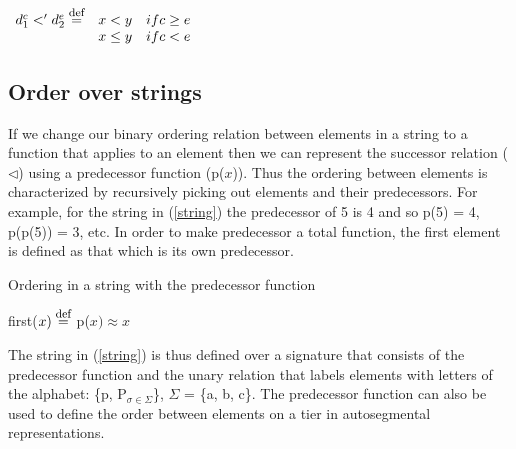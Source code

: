 \documentclass[,doc,floatsintext]{apa6}
\def\defeq{\mathrel{\buildrel \mbox{\footnotesize def} \over =}}
\theoremstyle{definition}
\theoremstyle{definition}
\theoremstyle{definition}
\theoremstyle{remark}
\begin{document}
\hspace{1.85in}
\(\begin{array}{ccc} d^c_1 <' d^e_2 \defeq & x<y & if c\geq e \\  & x\leq y & if c<e \end{array}\)
\vspace{0.2in}

\subsection{Order over strings}\label{order-over-strings}

If we change our binary ordering relation between elements in a string
to a function that applies to an element then we can represent the
successor relation (\(\lhd\)) using a predecessor function (p(\(x\))).
Thus the ordering between elements is characterized by recursively
picking out elements and their predecessors. For example, for the string
in (\ref{string}) the predecessor of 5 is 4 and so p(5) = 4, p(p(5)) =
3, etc. In order to make predecessor a total function, the first element
is defined as that which is its own predecessor.

\begin{exe}
\ex Ordering in a string with the predecessor function \label{string}\\
  
\ex first($x) \defeq$ p($x) \approx x$
\end{exe}

\noindent The string in (\ref{string}) is thus defined over a signature
that consists of the predecessor function and the unary relation that
labels elements with letters of the alphabet: \{p,
P\(_{\sigma\in\Sigma}\)\}, \(\Sigma\) = \{a, b, c\}. The predecessor
function can also be used to define the order between elements on a tier
in autosegmental representations.
\end{document}
